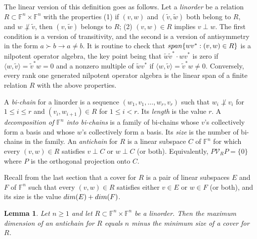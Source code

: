 \documentclass[10pt,a4paper]{amsart}
\newtheorem{lem}[thm]{Lemma}
\begin{document}
The linear version of this definition goes as follows. Let a {\it linorder} be a relation $R \subset \mathbb{F}^n \times \mathbb{F}^n$ with the properties (1) if $(v,w)$ and $(\tilde{v}, \tilde{w})$ both belong to $R$, and $w \not\perp \tilde{v}$, then $(v, \tilde{w})$ belongs to $R$; (2) $(v,w) \in R$ implies $v \perp w$. The first condition is a version of transitivity, and the second is a version of antisymmetry in the form $a \succ b \to a \neq b$. It is routine to check that ${\rm span}\{wv^*: (v,w) \in R\}$ is a nilpotent operator algebra, the key point being that $\tilde{w}\tilde{v}^*\cdot wv^*$ is zero if $\langle w, \tilde{v}\rangle = \tilde{v}^*w = 0$ and a nonzero multiple of $\tilde{w}v^*$ if $\langle w, \tilde{v}\rangle  = \tilde{v}^*w \neq 0$. Conversely, every rank one generated nilpotent operator algebra is the linear span of a finite relation $R$ with the above properties.

A {\it bi-chain} for a linorder is a sequence $(w_1, v_1, \ldots, w_r, v_r)$ such that $w_i \not\perp v_i$ for $1 \leq i \leq r$ and $(v_i, w_{i+1}) \in R$ for $1 \leq i < r$. Its {\it length} is the value $r$. A {\it decomposition of $\mathbb{F}^n$ into bi-chains} is a family of bi-chains whose $v$'s collectively form a basis and whose $w$'s collectively form a basis. Its {\it size} is the number of bi-chains in the family. An {\it antichain} for $R$ is a linear subspace $C$ of $\mathbb{F}^n$ for which every $(v,w) \in R$ satisfies $v \perp C$ or $w \perp C$ (or both). Equivalently, $P\mathcal{V}_R P = \{0\}$ where $P$ is the orthogonal projection onto $C$.

Recall from the last section that a cover for $R$ is a pair of linear subspaces $E$ and $F$ of $\mathbb{F}^n$ such that every $(v,w) \in R$ satisfies either $v \in E$ or $w \in F$ (or both), and its size is the value ${\rm dim}(E) + {\rm dim}(F)$.

\begin{lem}\label{dillem}
Let $n \geq 1$ and let $R \subset \mathbb{F}^n\times\mathbb{F}^n$ be a linorder. Then the maximum dimension of an antichain for $R$ equals $n$ minus the minimum size of a cover for $R$.
\end{lem}
\end{document}

